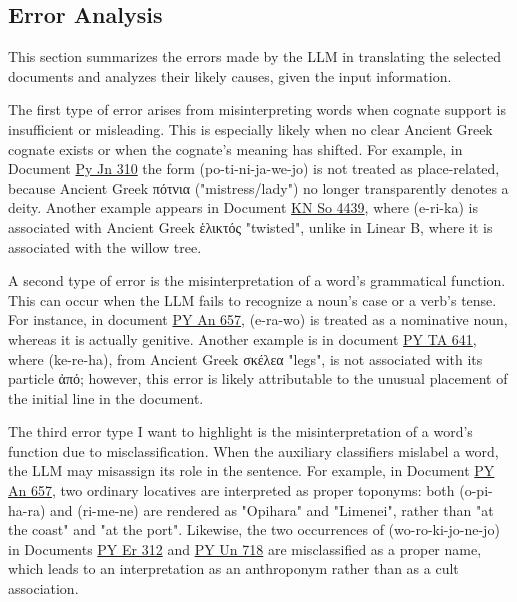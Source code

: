 \subsection{Error Analysis} \label{sec:errors}
This section summarizes the errors made by the LLM in translating the selected documents and analyzes their likely causes, given the input information.

The first type of error arises from misinterpreting words when cognate support is insufficient or misleading.
This is especially likely when no clear Ancient Greek cognate exists or when the cognate's meaning has shifted.
For example, in Document \hyperref[doc:pyjn310]{Py Jn 310} the form \textlinb{\Bpo\Bti\Bni\Bja\Bwe\Bjo} (po-ti-ni-ja-we-jo) is not treated as place-related, because Ancient Greek \textgreek{πότνια} ("mistress/lady") no longer transparently denotes a deity.
Another example appears in Document \hyperref[doc:knso4439]{KN So 4439}, where \textlinb{\Be\Bri\Bka} (e-ri-ka) is associated with Ancient Greek \textgreek{ἑλικτός} "twisted", unlike in Linear B, where it is associated with the willow tree.

A second type of error is the misinterpretation of a word's grammatical function.
This can occur when the LLM fails to recognize a noun's case or a verb's tense.
For instance, in document \hyperref[doc:pyan657]{PY An 657}, \textlinb{\Be\Bra\Bwo} (e-ra-wo) is treated as a nominative noun, whereas it is actually genitive.
Another example is in document \hyperref[doc:pyta641]{PY TA 641}, where \textlinb{\Bke\Bre\Baii} (ke-re-ha), from Ancient Greek \textgreek{σκέλεα} "legs", is not associated with its particle \textgreek{ἀπό}; however, this error is likely attributable to the unusual placement of the initial line in the document.

The third error type I want to highlight is the misinterpretation of a word's function due to misclassification.
When the auxiliary classifiers mislabel a word, the LLM may misassign its role in the sentence.
For example, in Document \hyperref[doc:pyan657]{PY An 657}, two ordinary locatives are interpreted as proper toponyms: both \textlinb{\Bo\Bpi\Baii\Bra} (o-pi-ha-ra) and \textlinb{\Bri\Bme\Bne} (ri-me-ne) are rendered as "Opihara" and "Limenei", rather than "at the coast" and "at the port".
Likewise, the two occurrences of \textlinb{\Bwo\Bro\Bki\Bjo\Bne\Bjo} (wo-ro-ki-jo-ne-jo) in Documents \hyperref[doc:pyer312]{PY Er 312} and \hyperref[doc:pyun718]{PY Un 718} are misclassified as a proper name, which leads to an interpretation as an anthroponym rather than as a cult association.

